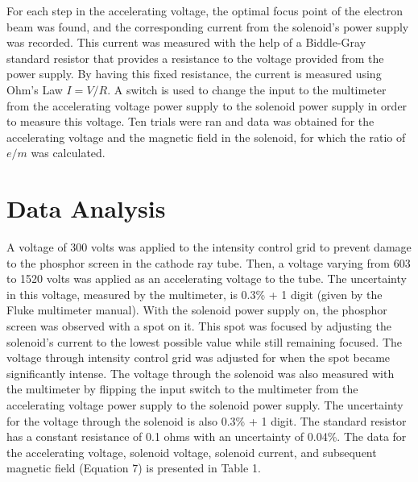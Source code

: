 \documentclass[%
 aip,
 amsmath,amssymb,
 reprint,%
floatfix,
]{revtex4-1}
\begin{document}
For each step in the accelerating voltage, the optimal focus point of the electron beam was found, and the corresponding current from the solenoid's power supply was recorded. This current was measured with the help of a Biddle-Gray standard resistor that provides a resistance to the voltage provided from the power supply. By having this fixed resistance, the current is measured using Ohm's Law $I=V/R$. A switch is used to change the input to the multimeter from the accelerating voltage power supply to the solenoid power supply in order to measure this voltage. Ten trials were ran and data was obtained for the accelerating voltage and the magnetic field in the solenoid, for which the ratio of $e/m$ was calculated.

\section{\label{sec:level4}Data Analysis}

A voltage of 300 volts was applied to the intensity control grid to prevent damage to the phosphor screen in the cathode ray tube. Then, a voltage varying from 603 to 1520 volts was applied as an accelerating voltage to the tube. The uncertainty in this voltage, measured by the multimeter, is 0.3\% + 1 digit (given by the Fluke multimeter manual\cite{Fluke}). With the solenoid power supply on, the phosphor screen was observed with a spot on it. This spot was focused by adjusting the solenoid's current to the lowest possible value while still remaining focused. The voltage through intensity control grid was adjusted for when the spot became significantly intense. The voltage through the solenoid was also measured with the multimeter by flipping the input switch to the multimeter from the accelerating voltage power supply to the solenoid power supply. The uncertainty for the voltage through the solenoid is also 0.3\% + 1 digit. The standard resistor has a constant resistance of 0.1 ohms with an uncertainty of 0.04\%. The data for the accelerating voltage, solenoid voltage, solenoid current, and subsequent magnetic field (Equation 7) is presented in Table 1.
\end{document}
